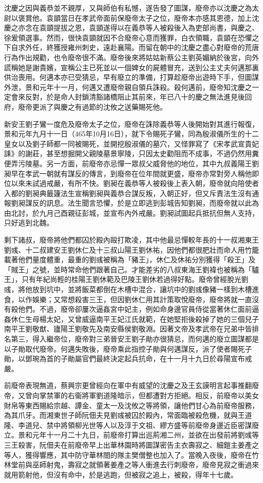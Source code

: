 沈慶之因與義恭並不親厚，又與師伯有私憾，遂告發了圖謀，廢帝亦以沈慶之為太尉以褒賞他。袁顗當日在孝武帝面前保廢帝太子之位，廢帝本亦感其恩德，加上沈慶之亦念在袁顗提拔之恩，袁顗遂得以在義恭等人被殺後入為吏部尚書，與慶之、徐爰領選事。然而，很快袁顗就因不合廢帝心意而獲罪，白衣領職，袁顗在恐懼之下自求外任，終獲授雍州刺史，遠赴襄陽。而留在朝中的沈慶之盡心對廢帝的荒唐行為作出規勸，也令廢帝很不滿。廢帝後來將姑姑新蔡公主劉英媚納於後宮，向外謊稱她是謝貴嬪，宣稱公主已死並以一個婢女的屍體冒充，送到公主丈夫何邁那裏供治喪用。何邁本亦已受猜忌，早有廢立的準備，打算趁廢帝出遊時下手，但圖謀外泄，景和元年十一月，何邁又遭廢帝親自領兵誅殺。殺何邁前，廢帝知沈慶之一定會來反對，於是命人封鎖清豁諸橋阻止其前來，年已八十的慶之無法進見後回府，廢帝更派了與慶之有過節的沈攸之送藥賜死他。

新安王劉子鸞一度危及廢帝太子之位，廢帝在誅除義恭等人後開始對其進行報復，景和元年九月十一日（465年10月16日），就下令賜死子鸞，同為殷淑儀所生的十二皇女以及劉子師都一同被賜死，並開挖殷淑儀的墓穴，又怪罪寫了《宋孝武宣貴妃誄》的謝莊，甚至想掘開父親陵墓景寧陵，只因太史勸阻而不成事，不過仍然用糞便弄污陵墓。另一方面，前廢帝亦忌憚一眾叔父威脅他的地位，其中九叔義陽王劉昶早在孝武一朝就有謀反的傳言，到廢帝在位年間就更盛，廢帝亦常對旁人稱他即位以來未試過戒嚴，有所不快。劉昶在義恭等人被殺後上表入朝，廢帝就向陪使者入都的劉昶典籤籧法生宣稱劉昶與義恭合謀反叛，入朝正好，但又斥責法生沒有通報劉昶謀反的訊息。法生聞言恐懼，於是立即逃到彭城告知劉昶，而廢帝就以此為由北討，於九月己酉親征彭城，並宣布內外戒嚴。劉昶試圖起兵抵抗但無人支持，只好逃到北魏。

剩下諸叔，廢帝將他們都囚於殿內毆打欺凌，其中他最忌憚較年長的十一叔湘東王劉彧、十二叔建安王劉休仁及十三叔山陽王劉休祐，因他們都很肥壯而命人用竹籠載著他們量度體重，最重的劉彧被稱為「豬王」，休仁及休祐分別獲得「殺王」及「賊王」之號，並時常命他們跟著自己。才能差劣的八叔東海王劉褘也被稱為「驢王」，只有年紀尚輕的桂陽王劉休範及巴陵王劉休若過得好點。廢帝曾經脫光劉彧，將他放到坑中，並將飯菜都倒在木槽中混合，讓坑中的劉彧像豬一樣到木槽進食，以作娛樂；又常想殺害三王，但因劉休仁用其計策取悅廢帝，廢帝將就一直沒有殺他們。不過，廢帝卻屢次逼姦宮中妃主，例如命身邊官員侍從當著休仁面前逼姦休仁生母楊太妃，又曾威逼南平王妃江氏就範，在她堅拒後殺掉了她的三個兒子南平王劉敬猷、廬陽王劉敬先及南安縣侯劉敬淵。因著文帝及孝武帝在兄弟中皆排名第三，得入繼帝位，廢帝對三弟晉安王劉子勛亦很猜忌，而何邁的廢立圖謀都是以子勛取代廢帝。何邁失敗後，廢帝乘此指控子勛與何邁謀反，派了使者賜死子勛，以鄧琬為首的子勛屬官們最終決定起兵抗命，在十一月十九日於尋陽宣布戒嚴。

前廢帝表現無道，蔡興宗更曾經向在軍中有威望的沈慶之及王玄謨明言起事推翻廢帝，又曾向掌禁軍的右衞將軍劉道隆暗示，但都遭對方拒絕。相反，前廢帝以美女財帛等東西賜給宗越、譚金、童太一及沈攸之等將領，讓他們甘心為前廢帝服務，為其爪牙。而湘東世子師阮佃夫見劉彧被囚於殿內，常面臨被殺危機，就與王道隆、李道兒、禁中將領柳光世等人以及淳于文祖、繆方盛等前廢帝身邊近臣密謀廢立。景和元年十一月二十九日，前廢帝打算出巡荊湘二州，並欲在出發前將劉彧等三王殺害，阮佃夫在前廢帝早上出華林園時將圖謀密告主衣壽寂之、細鎧主姜產之等人，獲得響應，其中防守華林閤的隊主樊僧整也加入了。當晚入夜後，廢帝在竹林堂前與巫師射鬼，壽寂之就領著姜產之等人衝進去行刺廢帝，廢帝見寂之衝過來就用箭射他，但沒有命中，於是逃跑，但被寂之追上，被殺，得年十七歲。

